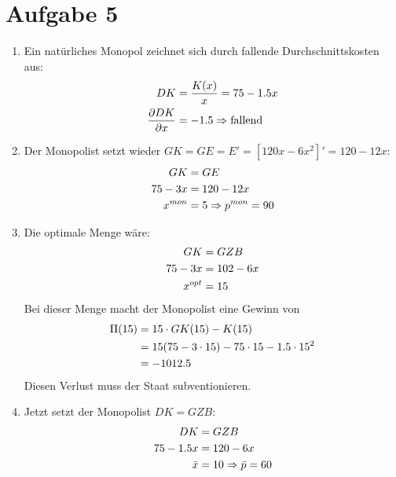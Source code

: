 \documentclass{article}
\begin{document}
	\section*{Aufgabe 5}
	\begin{enumerate}[label=(\alph*)]
		\item Ein natürliches Monopol zeichnet sich durch fallende Durchschnittskosten aus:
		\begin{align}
			DK &= \frac{K(x)}{x} = 75-1.5x \notag \\
			\frac{\partial DK}{\partial x} &= -1.5 \Rightarrow\text{fallend} \notag
		\end{align}
		\item Der Monopolist setzt wieder $GK=GE=E'=[120x-6x^2]'=120-12x$:
		\begin{align}
			GK &= GE \notag \\
			75-3x &= 120-12x \notag \\
			x^{mon} &= 5 \Rightarrow p^{mon}=90 \notag
		\end{align}
		\item Die optimale Menge wäre:
		\begin{align}
			GK &= GZB \notag \\
			75-3x &= 102-6x \notag \\
			x^{opt} &= 15 \notag
		\end{align}
		Bei dieser Menge macht der Monopolist eine Gewinn von
		\begin{align}
			\Pi(15) &= 15\cdot GK(15) - K(15) \notag \\
			&= 15(75-3\cdot 15) - 75\cdot 15 - 1.5\cdot 15^2 \notag \\
			&= -1012.5 \notag
		\end{align}
		Diesen Verlust muss der Staat subventionieren.
		\item Jetzt setzt der Monopolist $DK=GZB$:
		\begin{align}
			DK &= GZB \notag \\
			75-1.5x &= 120-6x \notag \\
			\bar{x} &= 10 \Rightarrow \bar{p}=60 \notag
		\end{align}
	\end{enumerate}
\end{document}
